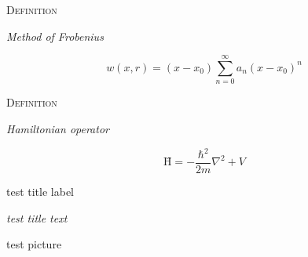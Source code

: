 \documentclass{article}
\newenvironment{flashcard}[2][]{%
\noindent  \textsc{#1} %

\vfill
\centerline{{\Large\emph{#2}}} %
\vfill
\newpage
}
{\newpage}
\begin{document}









\begin{flashcard}[Definition]{Method of Frobenius}

\begin{displaymath}
w(x,r)=(x-x_{0})\sum_{n=0}^{\infty}a_{n}(x-x_{0})^{n}
\end{displaymath}
\end{flashcard}

\begin{flashcard}[Definition]{Hamiltonian operator}
\begin{displaymath}
\textrm{\^H} = -\frac{\hbar^2}{2m}\nabla^2 + V
\end{displaymath}
\end{flashcard}


\noindent  test title label
\vfill
\centerline{{\Large\emph{test title text}}} %
\vfill
\newpage

\begin{center}
test picture
\end{center}
\newpage
\end{document}
